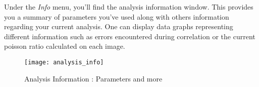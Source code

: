 \indent\indent Under the \textit{Info} menu, you'll find the analysis information window. This provides you a summary of parameters you've used along with others information regarding your current analysis. One can display data graphs representing different information such as errors encountered during correlation or the current poisson ratio calculated on each image.

\begin{figure}[!h]
   \centering
   \texttt{[image: analysis\_info]}
   \caption{Analysis Information : Parameters and more}
\end{figure}
